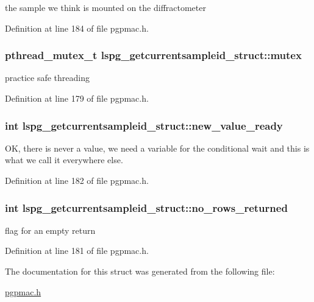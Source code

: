 the sample we think is mounted on the diffractometer 



Definition at line 184 of file pgpmac.\-h.

\hypertarget{structlspg__getcurrentsampleid__struct_ace54acbdcbce620437962858ba04e256}{
\subsubsection[{mutex}]{\setlength{\rightskip}{0pt plus 5cm}pthread\-\_\-mutex\-\_\-t lspg\-\_\-getcurrentsampleid\-\_\-struct\-::mutex}}\label{structlspg__getcurrentsampleid__struct_ace54acbdcbce620437962858ba04e256}


practice safe threading 



Definition at line 179 of file pgpmac.\-h.

\hypertarget{structlspg__getcurrentsampleid__struct_ada3840f03195ee1807150f1e75fd3775}{
\subsubsection[{new\-\_\-value\-\_\-ready}]{\setlength{\rightskip}{0pt plus 5cm}int lspg\-\_\-getcurrentsampleid\-\_\-struct\-::new\-\_\-value\-\_\-ready}}\label{structlspg__getcurrentsampleid__struct_ada3840f03195ee1807150f1e75fd3775}


O\-K, there is never a value, we need a variable for the conditional wait and this is what we call it everywhere else. 



Definition at line 182 of file pgpmac.\-h.

\hypertarget{structlspg__getcurrentsampleid__struct_a06758730db55730eb10d2d63e2520d71}{
\subsubsection[{no\-\_\-rows\-\_\-returned}]{\setlength{\rightskip}{0pt plus 5cm}int lspg\-\_\-getcurrentsampleid\-\_\-struct\-::no\-\_\-rows\-\_\-returned}}\label{structlspg__getcurrentsampleid__struct_a06758730db55730eb10d2d63e2520d71}


flag for an empty return 



Definition at line 181 of file pgpmac.\-h.



The documentation for this struct was generated from the following file\-:\begin{DoxyCompactItemize}
\item 
\hyperlink{pgpmac_8h}{pgpmac.\-h}\end{DoxyCompactItemize}
